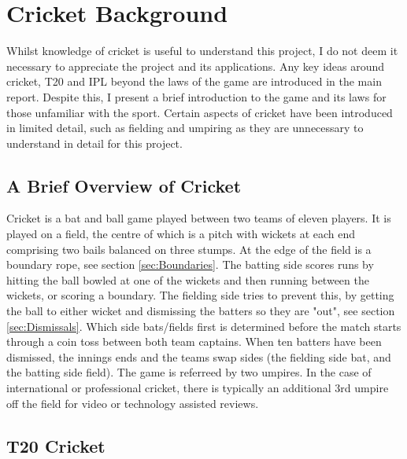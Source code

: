 \documentclass[12pt,a4paper]{report}
\theoremstyle{definition}
\begin{document}
\appendix


\chapter{Cricket Background} \label{chap:CrickBackground}

Whilst knowledge of cricket is useful to understand this project, I do not deem it necessary to appreciate the project and its applications.
Any key ideas around cricket, T20 and IPL beyond the laws of the game are introduced in the main report.
Despite this, I present a brief introduction to the game and its laws for those unfamiliar with the sport.
Certain aspects of cricket have been introduced in limited detail, such as fielding and umpiring as they are unnecessary to understand in detail for this project.

\section{A Brief Overview of Cricket}

Cricket is a bat and ball game played between two teams of eleven players. 
It is played on a field, the centre of which is a pitch with wickets at each end comprising two bails balanced on three stumps. 
At the edge of the field is a boundary rope, see section \ref{sec:Boundaries}. 
The batting side scores runs by hitting the ball bowled at one of the wickets and then running between the wickets, or scoring a boundary.
The fielding side tries to prevent this, by getting the ball to either wicket and dismissing the batters so they are "out", see section \ref{sec:Dismissals}.
Which side bats/fields first is determined before the match starts through a coin toss between both team captains.
When ten batters have been dismissed, the innings ends and the teams swap sides (the fielding side bat, and the batting side field).
The game is referreed by two umpires.
In the case of international or professional cricket, there is typically an additional 3rd umpire off the field for video or technology assisted reviews.

\section{T20 Cricket} \label{sec:T20Cricket}
\end{document}
